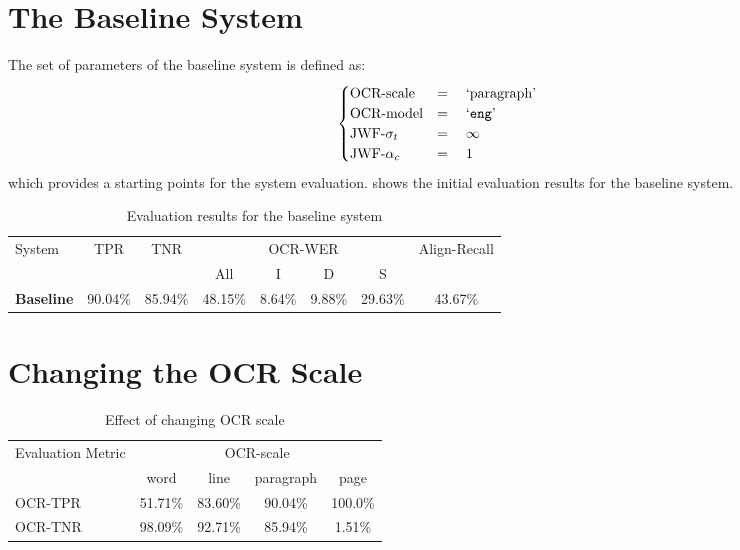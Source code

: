 \section{The Baseline System}

The set of parameters of the baseline system is defined as:
\begin{equation*}
    \begin{cases}
        \text{OCR-scale} &=\quad \text{`paragraph'} \\
        \text{OCR-model} &=\quad \text{`\texttt{eng}'} \\
        \text{JWF-}\sigma_t &=\quad \infty \\
        \text{JWF-}\alpha_c &=\quad 1
    \end{cases}
\end{equation*}
which provides a starting points for the system evaluation.  shows the initial evaluation results for the baseline system.

\begin{table}[!tb]
    \caption{Evaluation results for the baseline system}
    \centering
    \label{tab:eval-res-baseline}
    \begin{tabular}{l c c c c c c c}
    \toprule
    \multirow{2}{*}{System} &
    \multirow{2}{*}{TPR}& \multirow{2}{*}{TNR} & \multicolumn{4}{c}{OCR-WER} & \multirow{2}{*}{Align-Recall} \\
    \cmidrule{4-7}
    & & & All & I & D & S & \\
    \midrule
    \textbf{Baseline} &
    90.04\% & 85.94\% & 48.15\% & 8.64\% &9.88\% &29.63\% &43.67\% \\
    \bottomrule
    \end{tabular}
\end{table}

\section{Changing the OCR Scale}

\begin{table}[!b]
    \caption{Effect of changing OCR scale}
    \centering
    \label{tab:eval-res-scale}
    \begin{tabular}{l c c c c}
    \toprule
    \multirow{2}{*}{Evaluation Metric}& \multicolumn{4}{c}{OCR-scale}\\
    \cmidrule{2-5}
    & word & line & paragraph & page \\
    \midrule
    OCR-TPR & 51.71\%&83.60\%&90.04\%&100.0\%\\
    OCR-TNR & 98.09\%&92.71\%&85.94\%&1.51\%\\
    \bottomrule
    \end{tabular}
\end{table}


